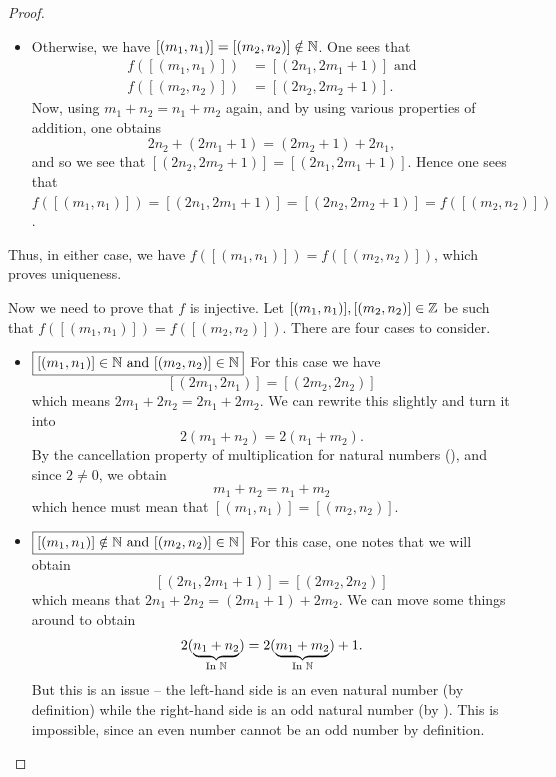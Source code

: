 \begin{proof}
\begin{itemize}
\begin{itemize}
            \item Otherwise, we have $[(m_1, n_1)] = [(m_2, n_2)] \notin \mathbb{N}$. One sees that
            \begin{align*}
                f([(m_1, n_1)]) &= [(2n_1, 2m_1 + 1)] \text{ and}\\
                f([(m_2, n_2)]) &= [(2n_2, 2m_2 + 1)].
            \end{align*}
            Now, using $m_1 + n_2 = n_1 + m_2$ again, and by using various properties of addition, one obtains
            \[
                2n_2 + (2m_1 + 1) = (2m_2 + 1) + 2n_1,
            \]
            and so we see that $[(2n_2, 2m_2 + 1)] = [(2n_1, 2m_1 + 1)]$. Hence one sees that $f([(m_1, n_1)]) = [(2n_1, 2m_1 + 1)] = [(2n_2, 2m_2 + 1)] = f([(m_2, n_2)])$.
        \end{itemize}
        Thus, in either case, we have $f([(m_1, n_1)]) = f([(m_2, n_2)])$, which proves uniqueness.
    \end{itemize}

    Now we need to prove that $f$ is injective. Let $[(m_1, n_1)], [(m_2, n_2)] \in \mathbb{Z}$ be such that $f([(m_1, n_1)]) = f([(m_2, n_2)])$. There are four cases to consider.
    \begin{itemize}
        \item $\boxed{[(m_1, n_1)] \in \mathbb{N} \text{ and } [(m_2, n_2)] \in \mathbb{N}}$ For this case we have
        \[
            [(2m_1, 2n_1)] = [(2m_2, 2n_2)]
        \]
        which means $2m_1 + 2n_2 = 2n_1 + 2m_2$. We can rewrite this slightly and turn it into
        \[
            2(m_1 + n_2) = 2(n_1 + m_2).
        \]
        By the cancellation property of multiplication for natural numbers (), and since $2 \neq 0$, we obtain
        \[
            m_1 + n_2 = n_1 + m_2
        \]
        which hence must mean that $[(m_1, n_1)] = [(m_2, n_2)]$.
        
        \item $\boxed{[(m_1, n_1)] \notin \mathbb{N} \text{ and } [(m_2, n_2)] \in \mathbb{N}}$ For this case, one notes that we will obtain
        \[
            [(2n_1, 2m_1 + 1)] = [(2m_2, 2n_2)]
        \]
        which means that $2n_1 + 2n_2 = (2m_1 + 1) + 2m_2$. We can move some things around to obtain
        \[
            2(\underbrace{n_1 + n_2}_{\text{In } \mathbb{N}}) = 2(\underbrace{m_1 + m_2}_{\text{In } \mathbb{N}}) + 1.
        \]
        But this is an issue -- the left-hand side is an even natural number (by definition) while the right-hand side is an odd natural number (by ). This is impossible, since an even number cannot be an odd number by definition.
        

\end{itemize}
\end{proof}
